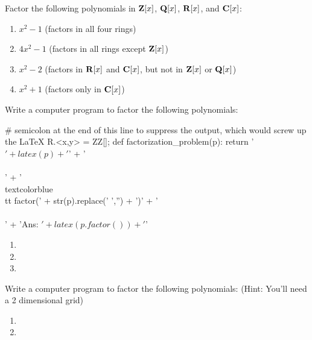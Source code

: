 \vfill\eject
{}

Factor the following polynomials in ${\bf Z}[x]$, ${\bf Q}[x]$, ${\bf R}[x]$, and ${\bf C}[x]$:

\begin{enumerate}
\item $x^2-1$  (factors in all four rings)
\item $4x^2-1$ (factors in all rings except ${\bf Z}[x]$)
\item $x^2-2$  (factors in ${\bf R}[x]$ and ${\bf C}[x]$, but not in ${\bf Z}[x]$ or ${\bf Q}[x]$)
\item $x^2+1$  (factors only in ${\bf C}[x]$)
\end{enumerate}

Write a computer program to factor the following polynomials:


\begin{sagecode}
# semicolon at the end of this line to suppress the output, which would screw up the LaTeX
R.<x,y> = ZZ[];
def factorization_problem(p):
    return '$' + latex(p) + '$' + '\\\\' + '\\textcolor{blue}{\\tt factor(' + str(p).replace(' ','') + ')}' + '\\\\' + '{Ans: $' + latex(p.factor()) + '$}'
\end{sagecode}

\begin{enumerate}[resume]

\item {}

\item {}

\item {}

\end{enumerate}

Write a computer program to factor the following polynomials:\hfil\break
\-\hspace{1cm} (Hint: You'll need a 2 dimensional grid)

\begin{enumerate}[resume]

\item {}

\item {}

\end{enumerate}
